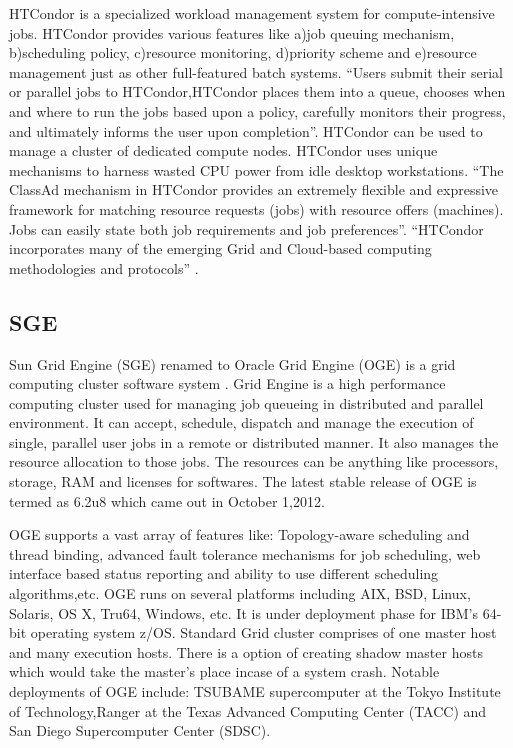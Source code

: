 {    
     HTCondor is a specialized workload management system for
     compute-intensive jobs.  HTCondor provides various features like
     a)job queuing mechanism, b)scheduling policy, c)resource
     monitoring, d)priority scheme and e)resource management just as
     other full-featured batch systems.  ``Users submit their serial or
     parallel jobs to HTCondor,HTCondor places them into a queue,
     chooses when and where to run the jobs based upon a policy,
     carefully monitors their progress, and ultimately informs the
     user upon completion''.  HTCondor can be used to manage a cluster
     of dedicated compute nodes. HTCondor uses unique mechanisms to
     harness wasted CPU power from idle desktop workstations. ``The
     ClassAd mechanism in HTCondor provides an extremely flexible and
     expressive framework for matching resource requests (jobs) with
     resource offers (machines).  Jobs can easily state both job
     requirements and job preferences''.  ``HTCondor incorporates many
     of the emerging Grid and Cloud-based computing methodologies and
     protocols'' \cite{htcondor}.

     \pv

     
\subsection{SGE}

     Sun Grid Engine (SGE) renamed
     to Oracle Grid Engine (OGE) is a grid computing cluster software
     system \cite{www-sge-wiki}. Grid Engine is a high performance
     computing cluster used
     for managing job queueing in distributed and parallel
     environment. It can accept, schedule, dispatch and manage the
     execution of single, parallel user jobs in a remote or
     distributed manner. It also manages the resource allocation to
     those jobs. The resources can be anything like processors,
     storage, RAM and licenses for softwares. The latest stable
     release of OGE is termed as 6.2u8 which came out in October
     1,2012.

     OGE supports a vast array of features like: Topology-aware
     scheduling and thread binding, advanced fault tolerance
     mechanisms for job scheduling, web interface based status
     reporting and ability to use different scheduling
     algorithms,etc. OGE runs on several platforms including AIX, BSD,
     Linux, Solaris, OS X, Tru64, Windows, etc. It is under deployment
     phase for IBM's 64-bit operating system z/OS. Standard Grid
     cluster comprises of one master host and many execution
     hosts. There is a option of creating shadow master hosts which
     would take the master's place incase of a system crash. Notable
     deployments of OGE include: TSUBAME supercomputer at the Tokyo
     Institute of Technology,Ranger at the Texas Advanced Computing
     Center (TACC) and San Diego Supercomputer Center (SDSC).

}
